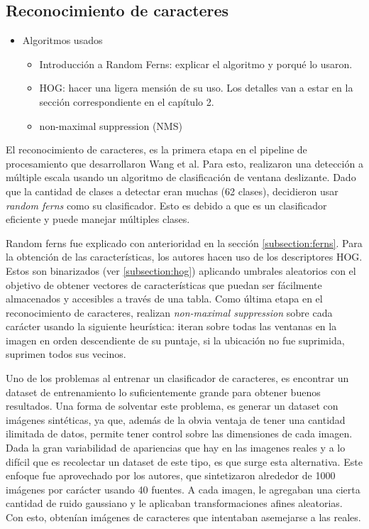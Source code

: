 \subsection{Reconocimiento de caracteres}

	\begin{itemize}
		\item Algoritmos usados
			\begin{itemize}
				\item Introducción a Random Ferns: explicar el algoritmo y porqué lo usaron.
				\item HOG: hacer una ligera mensión de su uso. Los detalles van a estar en la sección correspondiente en el capítulo 2.
				\item non-maximal suppression (NMS) 
			\end{itemize}
	\end{itemize}
	
	
	El reconocimiento de caracteres, es la primera etapa en el pipeline de procesamiento que desarrollaron Wang et al. Para esto, realizaron una detección a múltiple escala usando un algoritmo de clasificación de ventana deslizante. Dado que la cantidad de clases a detectar eran muchas (62 clases), decidieron usar \textit{random ferns} como su clasificador. Esto es debido a que es un clasificador eficiente y puede manejar múltiples clases.
	
	Random ferns fue explicado con anterioridad en la sección \ref{subsection:ferns}. Para la obtención de las características, los autores hacen uso de los descriptores HOG. Estos son binarizados (ver \ref{subsection:hog}) aplicando umbrales aleatorios con el objetivo de obtener vectores de características que puedan ser fácilmente almacenados y accesibles a través de una tabla. Como última etapa en el reconocimiento de caracteres, realizan \textit{non-maximal suppression} sobre cada carácter usando la siguiente heurística: iteran sobre todas las ventanas en la imagen en orden descendiente de su puntaje, si la ubicación no fue suprimida, suprimen todos sus vecinos.
	
	Uno de los problemas al entrenar un clasificador de caracteres, es encontrar un dataset de entrenamiento lo suficientemente grande para obtener buenos resultados. Una forma de solventar este problema, es generar un dataset con imágenes sintéticas, ya que, además de la  obvia ventaja de tener una cantidad ilimitada de datos, permite tener control sobre las dimensiones de cada imagen. Dada la gran variabilidad de apariencias que hay en las imagenes reales y a lo difícil que es recolectar un dataset de este tipo, es que surge esta alternativa. Este enfoque fue aprovechado por los autores, que sintetizaron alrededor de 1000 imágenes por carácter usando 40 fuentes. A cada imagen, le agregaban una cierta cantidad de ruido gaussiano y le aplicaban transformaciones afines aleatorias. Con esto, obtenían imágenes de caracteres que intentaban asemejarse a las reales.

	

